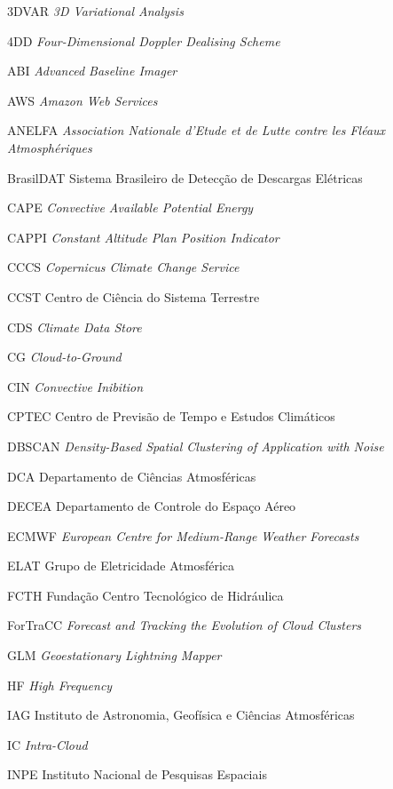 \begin{siglas}
  \item[3DVAR] \textit{3D Variational Analysis}
  \item[4DD] \textit{Four-Dimensional Doppler Dealising Scheme}
  \item[ABI] \textit{Advanced Baseline Imager}
  \item[AWS] \textit{Amazon Web Services}
  \item[ANELFA] \textit{Association Nationale d'Etude et de Lutte contre les Fléaux Atmosphériques}
  \item[BrasilDAT] Sistema Brasileiro de Detecção de Descargas Elétricas
  \item[CAPE] \textit{Convective Available Potential Energy}
  \item[CAPPI] \textit{Constant Altitude Plan Position Indicator}
  \item[CCCS] \textit{Copernicus Climate Change Service}
  \item[CCST] Centro de Ciência do Sistema Terrestre
  \item[CDS] \textit{Climate Data Store}
  \item[CG] \textit{Cloud-to-Ground}
  \item[CIN] \textit{Convective Inibition}
  \item[CPTEC] Centro de Previsão de Tempo e Estudos Climáticos
  \item[DBSCAN] \textit{Density-Based Spatial Clustering of Application with Noise}
  \item[DCA] Departamento de Ciências Atmosféricas
  \item[DECEA] Departamento de Controle do Espaço Aéreo
  \item[ECMWF] \textit{European Centre for Medium-Range Weather Forecasts}
  \item[ELAT] Grupo de Eletricidade Atmosférica
  \item[FCTH] Fundação Centro Tecnológico de Hidráulica
  \item[ForTraCC] \textit{Forecast and Tracking the Evolution of Cloud Clusters}
  \item[GLM] \textit{Geoestationary Lightning Mapper}
  \item[HF] \textit{High Frequency}
  \item[IAG] Instituto de Astronomia, Geofísica e Ciências Atmosféricas
  \item[IC] \textit{Intra-Cloud}
  \item[INPE] Instituto Nacional de Pesquisas Espaciais

\end{siglas}
